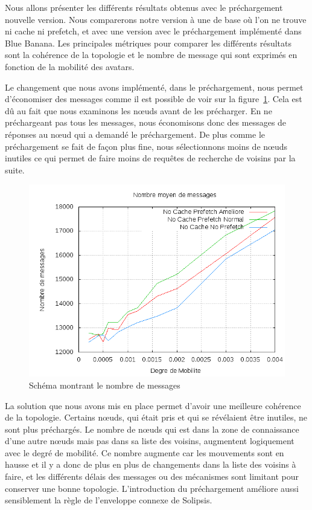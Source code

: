 Nous allons présenter les différents résultats obtenus avec le préchargement nouvelle version. Nous comparerons notre version à une de base où l'on ne trouve ni cache ni prefetch, et avec une version avec le préchargement implémenté dans Blue Banana. Les principales métriques pour comparer les différents résultats sont la cohérence de la topologie et le nombre de message qui sont exprimés en fonction de la mobilité des avatars.

\par Le changement que nous avons implémenté, dans le préchargement, nous permet d'économiser des messages comme il est possible de voir sur la figure~\ref{courbeNbMessPrefetch}. Cela est dû au fait que nous examinons les nœuds avant de les précharger. En ne préchargeant pas tous les messages, nous économisons donc des messages de réponses au nœud qui a demandé le préchargement. De plus comme le préchargement se fait de façon plus fine, nous sélectionnons moins de nœuds inutiles ce qui permet de faire moins de requêtes de recherche de voisins par la suite.
	\begin{figure}[!h]
        \centering
        \includegraphics[scale=0.5]{../CacheCode/SolipsisPeersim/resultats/Courbes/Courbes_Final_Rapport/Nombre_Messages_Prefetchs.png}
        \caption{Schéma montrant le nombre de messages}
        \label{courbeNbMessPrefetch}
        \end{figure}

\par La solution que nous avons mis en place permet d'avoir une meilleure cohérence de la topologie. Certains nœuds, qui était pris et qui se révélaient être inutiles, ne sont plus préchargés. Le nombre de nœuds qui est dans la zone de connaissance d'une autre nœuds mais pas dans sa liste des voisins, augmentent logiquement avec le degré de mobilité. Ce nombre augmente car les mouvements sont en hausse et il y a donc de plus en plus de changements dans la liste des voisins à faire, et les différents délais des messages ou des mécanismes sont limitant pour conserver une bonne topologie. L'introduction du préchargement améliore aussi sensiblement la règle de l'enveloppe connexe de Solipsis.

